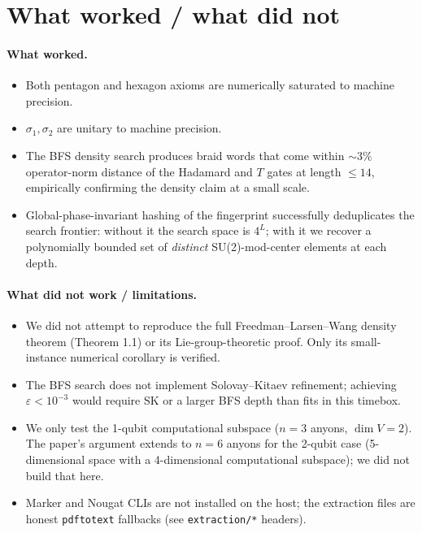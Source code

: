 \documentclass[11pt]{article}
\begin{document}
\section{What worked / what did not}

\paragraph{What worked.}
\begin{itemize}
    \item Both pentagon and hexagon axioms are numerically saturated to machine precision.
    \item $\sigma_1,\sigma_2$ are unitary to machine precision.
    \item The BFS density search produces braid words that come within $\sim 3\%$ operator-norm distance of the Hadamard and $T$ gates at length $\le 14$, empirically confirming the density claim at a small scale.
    \item Global-phase-invariant hashing of the fingerprint successfully deduplicates the search frontier: without it the search space is $4^L$; with it we recover a polynomially bounded set of \emph{distinct} SU(2)-mod-center elements at each depth.
\end{itemize}

\paragraph{What did not work / limitations.}
\begin{itemize}
    \item We did not attempt to reproduce the full Freedman--Larsen--Wang density theorem (Theorem 1.1) or its Lie-group-theoretic proof. Only its small-instance numerical corollary is verified.
    \item The BFS search does not implement Solovay--Kitaev refinement; achieving $\varepsilon < 10^{-3}$ would require SK or a larger BFS depth than fits in this timebox.
    \item We only test the 1-qubit computational subspace ($n=3$ anyons, $\dim V = 2$). The paper's argument extends to $n=6$ anyons for the 2-qubit case (5-dimensional space with a 4-dimensional computational subspace); we did not build that here.
    \item Marker and Nougat CLIs are not installed on the host; the extraction files are honest \texttt{pdftotext} fallbacks (see \texttt{extraction/*} headers).
\end{itemize}
\end{document}
